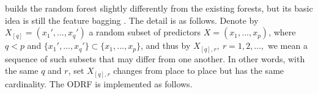  builds the random forest slightly differently from the existing forests, but its basic idea is still the feature bagging \citep{ho1998random}. The detail is as follows.
Denote by $ X_{[q]} = (x_1', ..., x_q')$ a random subset of predictors $ X  = (x_1, ..., x_p) $, where $ q < p$ and $ \{x_1', ..., x_q'\} \subset \{x_1, ..., x_p\} $, and thus  by $X_{[q], r},\ r=1, 2, ...,$  we mean a sequence of such subsets that may differ from one another.  In other words, with the same $ q $ and $ r$,  set $X_{[q], r}$ changes from place to place but has the same cardinality.
The ODRF is implemented as follows.
